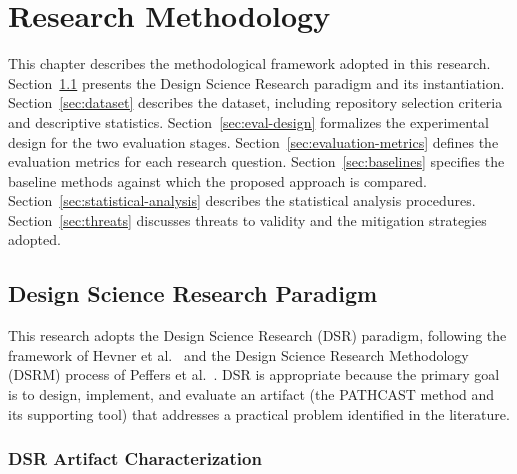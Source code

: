 
\chapter{Research Methodology}
\label{ch:methodology}

This chapter describes the methodological framework adopted in this 
research. Section~\ref{sec:dsr} presents the Design Science Research 
paradigm and its instantiation. Section~\ref{sec:dataset} describes the 
dataset, including repository selection criteria and descriptive 
statistics. Section~\ref{sec:eval-design} formalizes the experimental 
design for the two evaluation stages. Section~\ref{sec:evaluation-metrics} 
defines the evaluation metrics for each research question. 
Section~\ref{sec:baselines} specifies the baseline methods against which 
the proposed approach is compared. Section~\ref{sec:statistical-analysis} 
describes the statistical analysis procedures. 
Section~\ref{sec:threats} discusses threats to validity and the 
mitigation strategies adopted.


\section{Design Science Research Paradigm}
\label{sec:dsr}

This research adopts the Design Science Research (DSR) paradigm, following 
the framework of Hevner et al.~\cite{hevner2004} and the Design 
Science Research Methodology (DSRM) process of Peffers et 
al.~\cite{peffers2007}. DSR is appropriate because the primary goal 
is to design, implement, and evaluate an artifact (the PATHCAST 
method and its supporting tool) that addresses a practical problem 
identified in the literature.


\subsection{DSR Artifact Characterization}
\label{sec:dsr-artifact}


